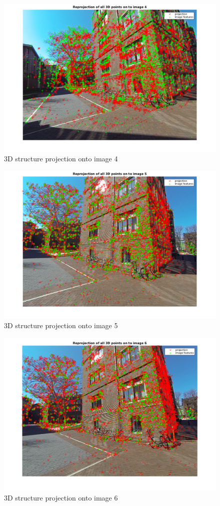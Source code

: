 \documentclass{article}
\begin{document}
\begin{figure}[!h]
\includegraphics[width = \textwidth]{f4.png}
\centering
\caption{3D structure projection onto image 4}
\end{figure}
\begin{figure}[!h]
\includegraphics[width = \textwidth]{f5.png}
\centering
\caption{3D structure projection onto image 5}
\end{figure}
\begin{figure}[!h]
\includegraphics[width = \textwidth]{f6.png}
\centering
\caption{3D structure projection onto image 6}
\end{figure}
\end{document}
